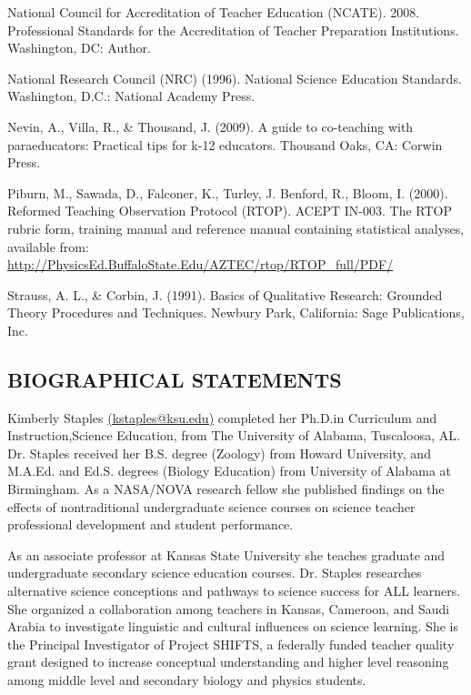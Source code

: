 \documentclass[11.5pt]{sig-alternate} %
\begin{document}
National Council for Accreditation of Teacher Education (NCATE). 2008. Professional Standards for the Accreditation of Teacher Preparation Institutions. Washington, DC: Author.

National Research Council (NRC) (1996). National Science Education Standards. Washington, D.C.: National Academy Press.

Nevin, A., Villa, R., \& Thousand, J. (2009). A guide to co-teaching with paraeducators: Practical tips for k-12 educators. Thousand Oaks, CA: Corwin Press.

Piburn, M., Sawada, D., Falconer, K., Turley, J. Benford, R., Bloom, I. (2000). Reformed Teaching Observation Protocol (RTOP). ACEPT IN-003. The RTOP rubric form, training manual and reference manual containing statistical analyses, available from: \url{http://PhysicsEd.BuffaloState.Edu/AZTEC/rtop/RTOP\_full/PDF/}

Strauss, A. L., \& Corbin, J. (1991). Basics of Qualitative Research: Grounded Theory Procedures and Techniques. Newbury Park, California: Sage Publications, Inc.

\clearpage
\begin{large}
\leftskip 0in
\parindent 0in 
\section*{BIOGRAPHICAL STATEMENTS}
Kimberly Staples \href{mailto:kstaples@ksu.edu}{(kstaples@ksu.edu)} completed her Ph.D.in Curriculum and Instruction,Science Education, from The University of Alabama, Tuscaloosa, AL. Dr. Staples received her B.S. degree (Zoology) from Howard University, and M.A.Ed. and Ed.S. degrees (Biology Education) from University of Alabama at Birmingham. As a NASA/NOVA research fellow she published findings on the effects of nontraditional undergraduate science courses on science teacher professional development and student performance.

As an associate professor at Kansas State University she teaches graduate and undergraduate secondary science education courses. Dr. Staples researches alternative science conceptions and pathways to science success for ALL learners. She organized a collaboration among teachers in Kansas, Cameroon, and Saudi Arabia to investigate linguistic and cultural influences on science learning. She is the Principal Investigator of Project SHIFTS, a federally funded teacher quality grant designed to increase conceptual understanding and higher level reasoning among middle level and secondary biology and physics students.

\end{large} 
\end{document}
